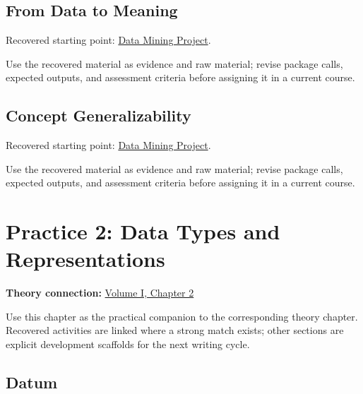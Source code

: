 \documentclass[
  letterpaper,
]{scrbook}
\begin{document}
\section*{From Data to Meaning}\label{sec-pr-01-from-data-to-meaning}


Recovered starting point: \hyperref[sec-lab-data-mining-project]{Data
Mining Project}.

Use the recovered material as evidence and raw material; revise package
calls, expected outputs, and assessment criteria before assigning it in
a current course.

\section*{Concept
Generalizability}\label{sec-pr-01-concept-generalizability}


Recovered starting point: \hyperref[sec-lab-data-mining-project]{Data
Mining Project}.

Use the recovered material as evidence and raw material; revise package
calls, expected outputs, and assessment criteria before assigning it in
a current course.

\chapter*{Practice 2: Data Types and
Representations}\label{ch-practice-02}


\textbf{Theory connection:} \hyperref[ch-representations]{Volume I,
Chapter 2}

Use this chapter as the practical companion to the corresponding theory
chapter. Recovered activities are linked where a strong match exists;
other sections are explicit development scaffolds for the next writing
cycle.

\section*{Datum}\label{sec-pr-02-datum}
\end{document}
